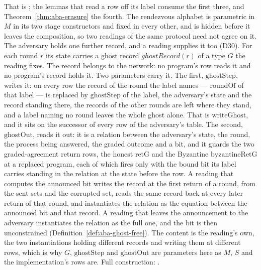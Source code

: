 \begin{definition}
  That is ; the lemmas that read a row off its label consume the first three, and Theorem~\ref{thm:aba-erasure} the fourth.
  The rendezvous alphabet is parametric in $M$ in its two stage constructors and fixed in every other, and is hidden before it leaves the composition, so two readings of the same protocol need not agree on it.
  The adversary holds one further record, and a reading supplies it too (D30).
  For each round $r$ its state carries a ghost record $ghostRecord(r)$ of a type $G$ the reading fixes.
  The record belongs to the network: no program's row reads it and no program's record holds it.
  Two parameters carry it.
  The first, $\mathrm{ghostStep}$, writes it: on every row the record of the round the label names --- $\mathrm{roundOf}$ of that label --- is replaced by $\mathrm{ghostStep}$ of the label, the adversary's state and the record standing there, the records of the other rounds are left where they stand, and a label naming no round leaves the whole ghost alone.
  That is $\mathrm{writeGhost}$, and it sits on the successor of every row of the adversary's table.
  The second, $\mathrm{ghostOut}$, reads it out: it is a relation between the adversary's state, the round, the process being answered, the graded outcome and a bit, and it guards the two graded-agreement return rows, the honest $\mathrm{retG}$ and the Byzantine $\mathrm{byzantineRetG}$ at a replaced program, each of which fires only with the bound bit its label carries standing in the relation at the state before the row.
  A reading that computes the announced bit writes the record at the first return of a round, from the sent sets and the corrupted set, reads the same record back at every later return of that round, and instantiates the relation as the equation between the announced bit and that record.
  A reading that leaves the announcement to the adversary instantiates the relation as the full one, and the bit is then unconstrained (Definition~\ref{def:aba-ghost-free}).
  The content is the reading's own, the two instantiations holding different records and writing them at different rows, which is why $G$, $\mathrm{ghostStep}$ and $\mathrm{ghostOut}$ are parameters here as $M$, $S$ and the implementation's rows are.
  Full construction: .
\end{definition}
